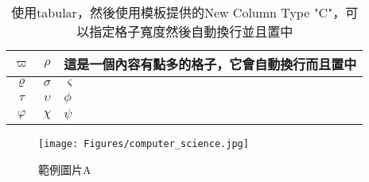 \begin{table}[ht]
    \centering
    \renewcommand{\arraystretch}{1.2}

    \begin{tabular}{ c | c | C{10em}}
        $\varpi $   & $\rho  $      & 這是一個內容有點多的格子，它會自動換行而且置中 \\ \hline\hline
        $\varrho  $ & $\sigma  $    & $\varsigma  $           \\\hline
        $\tau  $    & $\upsilon   $ & $\phi   $               \\\hline
        $\varphi $  & $\chi   $     & $\psi   $               \\\hline
    \end{tabular}

    \renewcommand{\arraystretch}{1}

    \caption{使用tabular，然後使用模板提供的New Column Type "C"，可以指定格子寬度然後自動換行並且置中}
    \label{tab:tabexample3}
\end{table}

\begin{figure}[hpbt]
    \centering
    \texttt{[image: Figures/computer\_science.jpg]}
    \caption{範例圖片A}
    \label{fig:figexample}
\end{figure}

